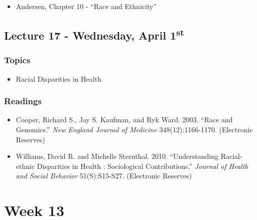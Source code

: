 \documentclass[]{book}
\providecommand{\tightlist}{%
  \setlength{\itemsep}{0pt}\setlength{\parskip}{0pt}}
\begin{document}
\begin{itemize}
\tightlist
\item
  Andersen, Chapter 10 - ``Race and Ethnicity''
\end{itemize}

\hypertarget{lecture-17---wednesday-april-1st}{%
\subsection*{\texorpdfstring{Lecture 17 - Wednesday, April 1\textsuperscript{st}}{Lecture 17 - Wednesday, April 1st}}\label{lecture-17---wednesday-april-1st}}

\hypertarget{topics-21}{%
\subsubsection*{Topics}\label{topics-21}}

\begin{itemize}
\tightlist
\item
  Racial Disparities in Health
\end{itemize}

\hypertarget{readings-19}{%
\subsubsection*{Readings}\label{readings-19}}

\begin{itemize}
\tightlist
\item
  Cooper, Richard S., Jay S. Kaufman, and Ryk Ward. 2003. ``Race and Genomics.'' \emph{New England Journal of Medicine} 348(12):1166-1170. (Electronic Reserves)
\item
  Williams, David R. and Michelle Sternthal. 2010. ``Understanding Racial-ethnic Disparities in Health : Sociological Contributions.'' \emph{Journal of Health and Social Behavior} 51(S):S15-S27. (Electronic Reserves)
\end{itemize}

\newpage

\hypertarget{week-13}{%
\section*{Week 13}\label{week-13}}
\end{document}
